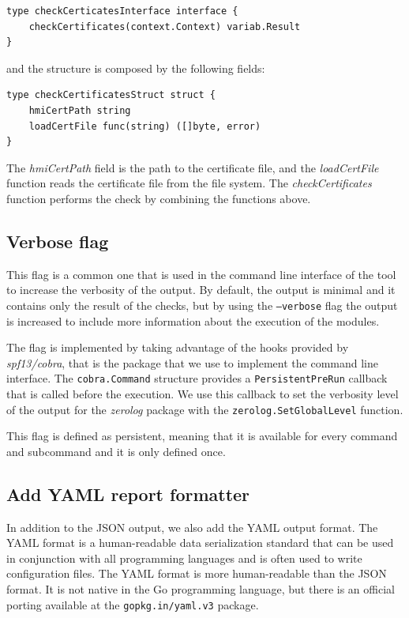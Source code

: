\begin{lstlisting}[style=golang]
type checkCerticatesInterface interface {
	checkCertificates(context.Context) variab.Result
}
\end{lstlisting}

and the structure is composed by the following fields:

\begin{lstlisting}[style=golang]
type checkCertificatesStruct struct {
	hmiCertPath string
	loadCertFile func(string) ([]byte, error)
}
\end{lstlisting}

The \textit{hmiCertPath} field is the path to the certificate file, and the \textit{loadCertFile} function reads the certificate file from the file system. The \textit{checkCertificates} function performs the check by combining the functions above.

\subsection{Verbose flag}

This flag is a common one that is used in the command line interface of the tool to increase the verbosity of the output. By default, the output is minimal and it contains only the result of the checks, but by using the \texttt{--verbose} flag the output is increased to include more information about the execution of the modules.

The flag is implemented by taking advantage of the hooks provided by \textit{spf13/cobra}, that is the package that we use to implement the command line interface. The \texttt{cobra.Command} structure provides a \texttt{PersistentPreRun} callback that is called before the execution. We use this callback to set the verbosity level of the output for the \textit{zerolog} package with the \texttt{zerolog.SetGlobalLevel} function.

This flag is defined as persistent, meaning that it is available for every command and subcommand and it is only defined once.

\subsection{Add YAML report formatter}

In addition to the JSON output, we also add the YAML output format. The YAML format is a human-readable data serialization standard that can be used in conjunction with all programming languages and is often used to write configuration files. The YAML format is more human-readable than the JSON format. It is not native in the Go programming language, but there is an official porting available at the \texttt{gopkg.in/yaml.v3} package.

